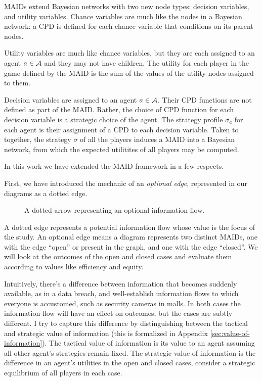 \documentclass[../thesis.tex]{subfiles}
\begin{document}
MAIDs extend Bayesian networks with two new node types:
decision variables, and utility variables.
Chance variables are much like the nodes in a Bayesian
network: a CPD is defined for each chance variable
that conditions on its parent nodes.

Utility variables are much like chance variables,
but they are each assigned to an agent $a \in \mathcal{A}$
and they may not have children.
The utility for each player in the game defined by
the MAID is the sum of the values of the utility
nodes assigned to them.

Decision variables are assigned to an agent $a \in \mathcal{A}$.
Their CPD functions are not defined as part of the MAID.
Rather, the choice of CPD function for each decision variable
is a strategic choice of the agent. The strategy profile $\sigma_a$
for each agent is their assignment of a CPD to each decision variable.
Taken to together, the strategy $\sigma$ of all the players
induces a MAID into a Bayesian network, from which the
expected utilitites of all players may be computed.

In this work we have extended the MAID framework in a few
respects.

First, we have introduced the mechanic of an \emph{optional edge},
represented in our diagrams as a dotted edge.

\begin{figure}
\begin{center}
\caption{A dotted arrow representing an optional information flow.}
\end{center}
\end{figure}

A dotted edge represents a potential information flow
whose value is the focus of the study.
An optional edge means a diagram represents two
distinct MAIDs, one with the edge ``open'' or present
in the graph, and one with the edge ``closed''.
We will look at the outcomes of the open and closed
cases and evaluate them
according to values like efficiency and equity.

Intuitively, there's a difference between information that
becomes suddenly available, as in a data breach, and
well-establish information flows to which everyone is
accustomed, such as security cameras in malls.
In both cases the information flow will have an effect on
outcomes, but the cases are subtly different.
I try to capture this difference by distinguishing between the
tactical and strategic
value of information (this is formalized in Appendix
\ref{sec:value-of-information}).
The tactical value of information is its value to an agent
assuming all other agent's strategies remain fixed.
The strategic value of information is the difference
in an agent's utilities in the open and closed cases,
consider a strategic equilibrium of all players in each case.
\end{document}
